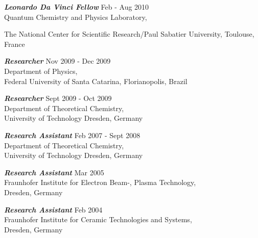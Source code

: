 \documentclass[line,margin]{res}
\begin{document}
\begin{resume}
                {\sl\textbf{Leonardo Da Vinci Fellow}} \hfill\smallskip Feb - Aug 2010\\
                \hspace*{1cm} Quantum Chemistry and Physics Laboratory,\\ 
                \hspace*{1cm} \parbox[t]{12cm}{The National Center for Scientific Research/Paul Sabatier University, Toulouse, France}
                 
                {\sl\textbf{Researcher}} \hfill\smallskip Nov 2009 - Dec 2009 \\
                \hspace*{1cm} Department of Physics,\\
                \hspace*{1cm} Federal University of Santa Catarina, Florianopolis, Brazil

                {\sl\textbf{Researcher}} \hfill\smallskip Sept 2009 - Oct 2009 \\
               \hspace*{1cm} Department of Theoretical Chemistry,\\
               \hspace*{1cm} University of Technology Dresden, Germany


                 {\sl\textbf{Research Assistant}} \hfill\smallskip Feb 2007 - Sept 2008 \\
                \hspace*{1cm} Department of Theoretical Chemistry,\\
                \hspace*{1cm} University of Technology Dresden, Germany
                
                {\sl\textbf{Research Assistant}} \hfill\smallskip Mar 2005 \\
                \hspace*{1cm} Fraunhofer Institute for Electron Beam-, Plasma Technology,\\
                \hspace*{1cm} Dresden, Germany

                {\sl\textbf{Research Assistant}} \hfill\smallskip Feb 2004 \\
                \hspace*{1cm} Fraunhofer Institute for Ceramic Technologies and Systems,\\
                \hspace*{1cm} Dresden, Germany



\end{resume}
\end{document}
